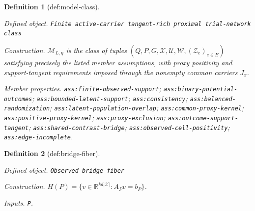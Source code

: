 \documentclass{article}
\newtheorem{definition}{Definition}
\begin{document}
\begin{definition}[def:model-class]\label{def:model-class}
\par\smallskip\noindent\emph{Defined object.} \texttt{Finite active-\allowbreak{}carrier tangent-\allowbreak{}rich proximal trial-\allowbreak{}network class}
\par\smallskip\noindent\emph{Construction.} \(\mathcal M_{L,\eta}\) is the class of tuples \((Q,P,G,\mathcal X,\mathcal U,\mathcal W,(\mathcal Z_e)_{e\in E})\) satisfying precisely the listed member assumptions, with proxy positivity and support-tangent requirements imposed through the nonempty common carriers \(J_x\).
\par\smallskip\noindent\emph{Member properties.} \texttt{ass:\allowbreak{}finite-\allowbreak{}observed-\allowbreak{}support}; \texttt{ass:\allowbreak{}binary-\allowbreak{}potential-\allowbreak{}outcomes}; \texttt{ass:\allowbreak{}bounded-\allowbreak{}latent-\allowbreak{}support}; \texttt{ass:\allowbreak{}consistency}; \texttt{ass:\allowbreak{}balanced-\allowbreak{}randomization}; \texttt{ass:\allowbreak{}latent-\allowbreak{}population-\allowbreak{}overlap}; \texttt{ass:\allowbreak{}common-\allowbreak{}proxy-\allowbreak{}kernel}; \texttt{ass:\allowbreak{}positive-\allowbreak{}proxy-\allowbreak{}kernel}; \texttt{ass:\allowbreak{}proxy-\allowbreak{}exclusion}; \texttt{ass:\allowbreak{}outcome-\allowbreak{}support-\allowbreak{}tangent}; \texttt{ass:\allowbreak{}shared-\allowbreak{}contrast-\allowbreak{}bridge}; \texttt{ass:\allowbreak{}observed-\allowbreak{}cell-\allowbreak{}positivity}; \texttt{ass:\allowbreak{}edge-\allowbreak{}incomplete}.
\end{definition}

\begin{definition}[def:bridge-fiber]\label{def:bridge-fiber}
\par\smallskip\noindent\emph{Defined object.} \texttt{Observed bridge fiber}
\par\smallskip\noindent\emph{Construction.} \(H(P)=\{v\in\mathbb R^{k d|\mathcal X|}:A_Pv=b_P\}\).
\par\smallskip\noindent\emph{Inputs.} \texttt{P}.
\end{definition}
\end{document}

